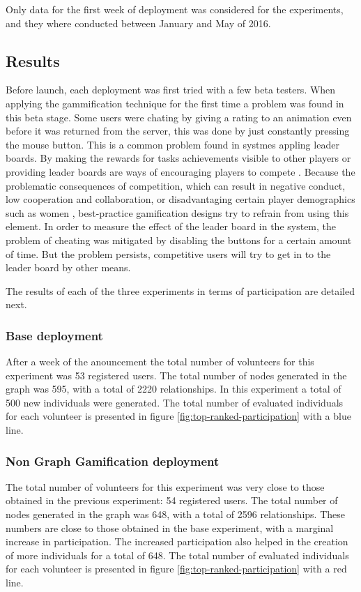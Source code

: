 \documentclass[conference]{IEEEtran}
\begin{document}
Only data for the first week of deployment was considered for the experiments, and they where conducted 
between January and May of 2016. 

\subsection{Results}
\label{sec:results}

Before launch, each deployment was first tried with a few beta testers. When applying the gammification
technique for the first time a problem was found in this beta stage. Some users were chating by 
giving a rating to an animation even before it was returned from the server, this was done by just
constantly pressing the mouse button. This is a common problem found in systmes appling leader boards.
By making the rewards for tasks achievements visible to other players or providing leader boards are ways of 
encouraging players to compete \cite{hickman2010total}. Because the  problematic consequences of competition, 
which can result in negative conduct, low cooperation and collaboration, or disadvantaging certain player
demographics such as women \cite{kumar2013gamification}, best-practice gamification designs try to
refrain from using this element. In order to measure the effect of the leader board in the system, the 
problem of cheating was mitigated by disabling the buttons for a certain amount of time. But the problem 
persists, competitive users will try to get in to the leader board by other means. 
% 
%

The results of each of the three experiments in terms of participation are detailed next.

\subsubsection{ Base deployment}
After a week of the anouncement the total number of volunteers for this experiment was 53 registered users. 
The total number of nodes generated in the graph was 595, with a total of 2220 relationships. In this
experiment a total of 500 new individuals were generated. The total number of evaluated
individuals for each volunteer is presented in figure \ref{fig:top-ranked-participation} with a blue line. 


\subsubsection{ Non Graph Gamification deployment}
The total number of volunteers for this experiment was very close to those obtained in the previous
experiment: 54 registered users. The total number of nodes generated in the graph was 648, 
with a total of 2596 relationships. These numbers are close to those obtained in the base experiment,
with a marginal increase in participation. The increased participation also helped in the creation of
more individuals for a total of 648. The total number of evaluated
individuals for each volunteer is presented in figure \ref{fig:top-ranked-participation} with a red line. 
\end{document}
